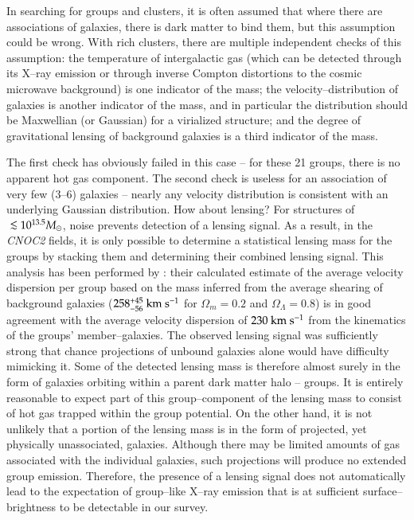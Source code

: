 In searching for groups and clusters, it is often assumed that where
there are associations of galaxies, there is dark matter to bind them,
but this assumption could be wrong.  With rich clusters, there are
multiple independent checks of this assumption: the temperature of
intergalactic gas (which can be detected through its X--ray emission
or through inverse Compton distortions to the cosmic microwave
background) is one indicator of the mass; the velocity--distribution
of galaxies is another indicator of the mass, and in particular the
distribution should be Maxwellian (or Gaussian) for a virialized
structure; and the degree of gravitational lensing of background
galaxies is a third indicator of the mass.

The first check has obviously failed in this case -- for these 21
groups, there is no apparent hot gas component.  The second check is
useless for an association of very few (3--6) galaxies -- nearly any
velocity distribution is consistent with an underlying Gaussian
distribution.  How about lensing?  For structures of $\lsim 10^{13.5}
M_\sun$, noise prevents detection of a lensing signal.  As a result,
in the \textsl{CNOC2} fields, it is only possible to determine a
statistical lensing mass for the groups by stacking them and
determining their combined lensing signal.  This analysis has been
performed by \citet{hoekstra_et_al2001, hoekstra_et_al2003CNOC2}:
their calculated estimate of the average velocity dispersion per group
based on the mass inferred from the average shearing of background
galaxies ($258_{-56}^{+45} {\rm~km~s^{-1}}$ for $\Omega_m=0.2$ and
$\Omega_\Lambda=0.8$) is in good agreement with the average velocity
dispersion of $230 {\rm~km~s^{-1}}$ from the kinematics of the groups'
member--galaxies.  The observed lensing signal was sufficiently strong
that chance projections of unbound galaxies alone would have
difficulty mimicking it.  Some of the detected lensing mass is
therefore almost surely in the form of galaxies orbiting within a
parent dark matter halo -- groups.  It is entirely reasonable to
expect part of this group--component of the lensing mass to consist of
hot gas trapped within the group potential.  On the other hand, it is
not unlikely that a portion of the lensing mass is in the form of
projected, yet physically unassociated, galaxies.  Although there may
be limited amounts of gas associated with the individual galaxies,
such projections will produce no extended group emission.  Therefore,
the presence of a lensing signal does not automatically lead to the
expectation of group--like X--ray emission that is at sufficient
surface--brightness to be detectable in our survey.

